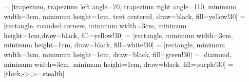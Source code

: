 
%
    
\lstdefinestyle{antlr}{
    basicstyle=\small\ttfamily\color{green!50!black},%
    breaklines=true,%
    moredelim=[s][\color{red}\ttfamily]{'}{'},%
    moredelim=*[s][\color{black}\ttfamily]{options}{\}},%
    commentstyle={\color{gray}\itshape},%
    morecomment=[l]{//},%
    emph={fragment},
    emphstyle={\color{blue}\ttfamily},
    otherkeywords={>,<,.,;,!,=,~},
    morekeywords={>,<,.,;,!,=,~},
    keywordstyle=\color{black}
}

\newenvironment{longlisting}{\captionsetup{type=listing}}{}
\newcommand{\subsubsubsection}[1]{\paragraph{#1}\mbox{}\\}
\usepackage{parskip}
\usepackage{algpseudocode}
\usepackage{algorithm}
\usepackage{bytefield}
\usepackage{xpatch,letltxmacro}
\LetLtxMacro{\cminted}{\minted}
\let\endcminted\endminted
{}
\renewcommand{\figurename}{Listing}
\usepackage{pgf}
\usepackage{luatexja-fontspec}
\usepackage{diagbox}


\usetikzlibrary{positioning}
 = [trapezium, trapezium left angle=70, trapezium right angle=110, minimum width=3cm, minimum height=1cm, text centered, draw=black, fill=yellow!30]
 = [rectangle, rounded corners, minimum width=3cm, minimum height=1cm,draw=black, fill=yellow!30]
 = [rectangle, minimum width=3cm, minimum height=1cm, draw=black, fill=white!30]
 = [rectangle, minimum width=3cm, minimum height=1cm, draw=black, fill=green!30]
 = [diamond, minimum width=3cm, minimum height=1cm, draw=black, fill=purple!30]
 = [thick,->,>=stealth]

